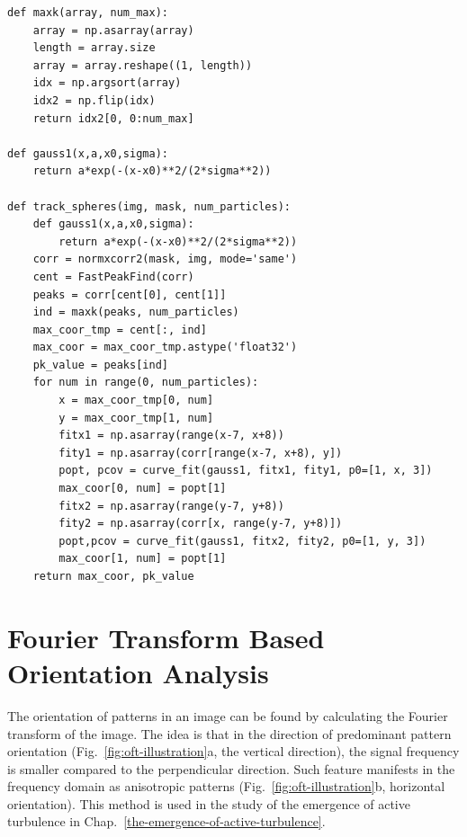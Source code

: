 \begin{verbatim}
def maxk(array, num_max):
    array = np.asarray(array)
    length = array.size
    array = array.reshape((1, length))
    idx = np.argsort(array)
    idx2 = np.flip(idx)
    return idx2[0, 0:num_max]

def gauss1(x,a,x0,sigma):
    return a*exp(-(x-x0)**2/(2*sigma**2))

def track_spheres(img, mask, num_particles):
    def gauss1(x,a,x0,sigma):
        return a*exp(-(x-x0)**2/(2*sigma**2))
    corr = normxcorr2(mask, img, mode='same')
    cent = FastPeakFind(corr)
    peaks = corr[cent[0], cent[1]]
    ind = maxk(peaks, num_particles)
    max_coor_tmp = cent[:, ind]
    max_coor = max_coor_tmp.astype('float32')
    pk_value = peaks[ind]
    for num in range(0, num_particles):
        x = max_coor_tmp[0, num]
        y = max_coor_tmp[1, num]
        fitx1 = np.asarray(range(x-7, x+8))
        fity1 = np.asarray(corr[range(x-7, x+8), y])
        popt, pcov = curve_fit(gauss1, fitx1, fity1, p0=[1, x, 3])
        max_coor[0, num] = popt[1]
        fitx2 = np.asarray(range(y-7, y+8))
        fity2 = np.asarray(corr[x, range(y-7, y+8)])
        popt,pcov = curve_fit(gauss1, fitx2, fity2, p0=[1, y, 3])
        max_coor[1, num] = popt[1]
    return max_coor, pk_value
\end{verbatim}


\section{Fourier Transform Based Orientation Analysis}
\label{sec:A-fourier-transform-based-orientation-analysis}

The orientation of patterns in an image can be found by calculating the Fourier transform of the image. The idea is that in the direction of predominant pattern orientation (Fig.~\ref{fig:oft-illustration}a, the vertical direction), the signal frequency is smaller compared to the perpendicular direction. Such feature manifests in the frequency domain as anisotropic patterns (Fig.~\ref{fig:oft-illustration}b, horizontal orientation). This method is used in the study of the emergence of active turbulence in Chap.~\ref{the-emergence-of-active-turbulence}.

